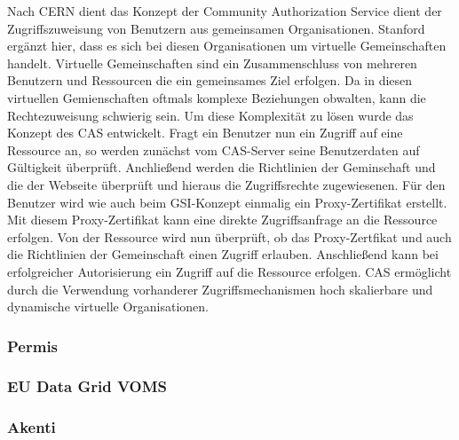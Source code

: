 \documentclass[utf8,biblatex]{lni}
\begin{document}
Nach CERN dient das Konzept der Community Authorization Service dient der Zugriffszuweisung von Benutzern aus gemeinsamen Organisationen. Stanford ergänzt hier, dass es sich bei diesen Organisationen
um virtuelle Gemeinschaften handelt. Virtuelle Gemeinschaften sind ein Zusammenschluss von mehreren Benutzern und Ressourcen die ein gemeinsames Ziel erfolgen. Da 
in diesen virtuellen Gemienschaften oftmals komplexe Beziehungen obwalten, kann die Rechtezuweisung schwierig sein. Um diese Komplexität zu lösen wurde das Konzept des CAS entwickelt.
Fragt ein Benutzer nun ein Zugriff auf eine Ressource an, so werden zunächst vom CAS-Server seine Benutzerdaten auf Gültigkeit überprüft. Anchließend werden die Richtlinien der Geminschaft und die der Webseite überprüft und 
hieraus die Zugriffsrechte zugewiesenen. Für den Benutzer wird wie auch beim GSI-Konzept einmalig ein Proxy-Zertifikat erstellt. Mit diesem Proxy-Zertifikat kann eine direkte Zugriffsanfrage 
an die Ressource erfolgen. Von der Ressource wird nun überprüft, ob das Proxy-Zertfikat und auch die Richtlinien der Gemeinschaft einen Zugriff erlauben. Anschließend kann bei
erfolgreicher Autorisierung ein Zugriff auf die Ressource erfolgen. CAS ermöglicht durch die Verwendung vorhanderer Zugriffsmechanismen hoch skalierbare und dynamische virtuelle 
Organisationen.

\subsubsection{Permis}

\subsubsection{EU Data Grid VOMS}

\subsubsection{Akenti}



\end{document}
